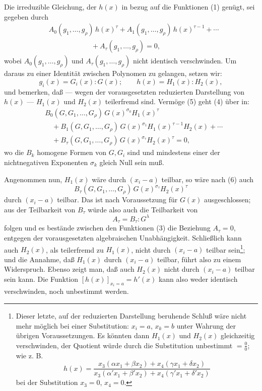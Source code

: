 Die irreduzible Gleichung, der $h(x)$ in bezug auf die Funktionen (1) genügt, sei gegeben durch
\begin{equation}
\begin{aligned}
&A_0(g_1,\ldots,g_\rho)\,h(x)^\tau
 +A_1(g_1,\ldots,g_\rho)\,h(x)^{\tau-1}
 +\cdots \\
&\hspace{6em}+A_\tau(g_1,\ldots,g_\rho)=0,
\end{aligned}
\tag{4}
\end{equation}
wobei $A_0(g_1,
\ldots,g_\rho)$ und $A_\tau(g_1,\ldots,g_\rho)$ nicht identisch verschwinden. Um daraus zu einer Identität zwischen Polynomen zu gelangen, setzen wir:
\begin{equation}
  g_i(x)=G_i(x):G(x);\qquad h(x)=H_1(x):H_2(x),
\tag{5}
\end{equation}
und bemerken, daß --- wegen der vorausgesetzten reduzierten Darstellung von $h(x)$ --- $H_1(x)$ und $H_2(x)$ teilerfremd sind. Vermöge (5) geht (4) über in:
\begin{equation}
\begin{aligned}
&B_0(G,G_1,\ldots,G_\rho)\,G(x)^{\sigma_0}H_1(x)^\tau \\
&\quad+B_1(G,G_1,\ldots,G_\rho)\,G(x)^{\sigma_1}H_1(x)^{\tau-1}H_2(x)+\cdots \\
&\quad+B_\tau(G,G_1,\ldots,G_\rho)\,G(x)^{\sigma_\tau}H_2(x)^\tau=0,
\end{aligned}
\tag{6}
\end{equation}
wo die $B_k$ homogene Formen von $G,G_i$ sind und mindestens einer der nichtnegativen Exponenten $\sigma_k$ gleich Null sein muß.

Angenommen nun, $H_1(x)$ wäre durch $(x_i-a)$ teilbar, so wäre nach (6) auch
\[
  B_\tau(G,G_1,\ldots,G_\rho)\,G(x)^{\sigma_\tau}H_2(x)^\tau
\]
durch $(x_i-a)$ teilbar. Das ist nach Voraussetzung für $G(x)$ ausgeschlossen; aus der Teilbarkeit von $B_\tau$ würde also auch die Teilbarkeit von
\[
  A_\tau=B_\tau:G^\lambda
\]
folgen und es bestände zwischen den Funktionen (3) die Beziehung $A_\tau=0$, entgegen der vorausgesetzten algebraischen Unabhängigkeit. Schließlich kann auch $H_2(x)$, als teilerfremd zu $H_1(x)$, nicht durch $(x_i-a)$ teilbar sein\footnote{Dieser letzte, auf der reduzierten Darstellung beruhende Schluß wäre nicht mehr möglich bei einer Substitution: $x_i=a$, $x_k=b$ unter Wahrung der übrigen Voraussetzungen. Es könnten dann $H_1(x)$ und $H_2(x)$ gleichzeitig verschwinden, der Quotient würde durch die Substitution unbestimmt $=\frac{0}{0}$; wie z. B.
\[
 h(x)=\frac{x_3(\alpha x_1+\beta x_2)+x_4(\gamma x_1+\delta x_2)}
 {x_3(\alpha' x_1+\beta' x_2)+x_4(\gamma' x_1+\delta' x_2)}
\]
bei der Substitution $x_3=0$, $x_4=0$.}; und die Annahme, daß $H_1(x)$ durch $(x_i-a)$ teilbar, führt also zu einem Widerspruch. Ebenso zeigt man, daß auch $H_2(x)$ nicht durch $(x_i-a)$ teilbar sein kann. Die Funktion $[h(x)]_{x_i=a}=h'(x)$ kann also weder identisch verschwinden, noch unbestimmt werden.

